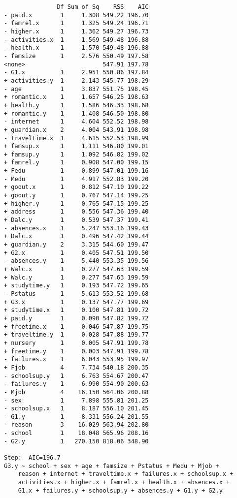 \documentclass[11pt]{article}
\begin{document}
\begin{enumerate}
\begin{verbatim}
               Df Sum of Sq    RSS    AIC
- paid.x        1     1.308 549.22 196.70
- famrel.x      1     1.325 549.24 196.71
- higher.x      1     1.362 549.27 196.73
- activities.x  1     1.569 549.48 196.88
- health.x      1     1.570 549.48 196.88
- famsize       1     2.576 550.49 197.58
<none>                      547.91 197.78
- G1.x          1     2.951 550.86 197.84
+ activities.y  1     2.143 545.77 198.29
- age           1     3.837 551.75 198.45
+ romantic.x    1     1.657 546.25 198.63
+ health.y      1     1.586 546.33 198.68
+ romantic.y    1     1.408 546.50 198.80
- internet      1     4.604 552.52 198.98
+ guardian.x    2     4.004 543.91 198.98
- traveltime.x  1     4.615 552.53 198.99
+ famsup.x      1     1.111 546.80 199.01
+ famsup.y      1     1.092 546.82 199.02
+ famrel.y      1     0.908 547.00 199.15
+ Fedu          1     0.899 547.01 199.16
- Medu          1     4.917 552.83 199.20
+ goout.x       1     0.812 547.10 199.22
+ goout.y       1     0.767 547.14 199.25
+ higher.y      1     0.765 547.15 199.25
+ address       1     0.556 547.36 199.40
+ Dalc.y        1     0.539 547.37 199.41
- absences.x    1     5.247 553.16 199.43
+ Dalc.x        1     0.496 547.42 199.44
+ guardian.y    2     3.315 544.60 199.47
+ G2.x          1     0.405 547.51 199.50
- absences.y    1     5.440 553.35 199.56
+ Walc.x        1     0.277 547.63 199.59
+ Walc.y        1     0.277 547.63 199.59
+ studytime.y   1     0.193 547.72 199.65
- Pstatus       1     5.613 553.52 199.68
+ G3.x          1     0.137 547.77 199.69
+ studytime.x   1     0.100 547.81 199.72
+ paid.y        1     0.090 547.82 199.72
+ freetime.x    1     0.046 547.87 199.75
+ traveltime.y  1     0.028 547.88 199.77
+ nursery       1     0.005 547.91 199.78
+ freetime.y    1     0.003 547.91 199.78
- failures.x    1     6.043 553.95 199.97
+ Fjob          4     7.734 540.18 200.35
- schoolsup.y   1     6.763 554.67 200.47
- failures.y    1     6.990 554.90 200.63
- Mjob          4    16.150 564.06 200.88
- sex           1     7.898 555.81 201.25
- schoolsup.x   1     8.187 556.10 201.45
- G1.y          1     8.331 556.24 201.55
- reason        3    16.029 563.94 202.80
- school        1    18.048 565.96 208.16
- G2.y          1   270.150 818.06 348.90

Step:  AIC=196.7
G3.y ~ school + sex + age + famsize + Pstatus + Medu + Mjob + 
    reason + internet + traveltime.x + failures.x + schoolsup.x + 
    activities.x + higher.x + famrel.x + health.x + absences.x + 
    G1.x + failures.y + schoolsup.y + absences.y + G1.y + G2.y


\end{verbatim}
\end{enumerate}
\end{document}
